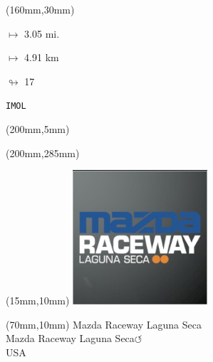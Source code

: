 \begin{textblock*}{40mm}(160mm,30mm)%
\Large
\par$\mapsto$ 3.05 mi.
\par$\mapsto$ 4.91 km
\par$\looparrowright$ 17
\par\hfill\tiny\tt IMOL\\
\end{textblock*}
\begin{textblock*}{20mm}(200mm,5mm)%
\fbox{\thepage}
\label{IMOL}
\end{textblock*}
\begin{textblock*}{20mm}(200mm,285mm)%
\fbox{\thepage}
\end{textblock*}

\null\newpage
\begin{textblock*}{50mm}(15mm,10mm)%
\includegraphics[width=50mm]{LG/2015-05-20_00085.png}
\end{textblock*}
\begin{textblock*}{130mm}(70mm,10mm)%
{\fontsize{20}{20}\selectfont Mazda Raceway Laguna Seca\\}
{\fontsize{16}{16}\selectfont Mazda Raceway Laguna Seca\hfill \huge$\circlearrowleft$\\}
{\fontsize{12}{12}\selectfont USA\\}
\end{textblock*}
